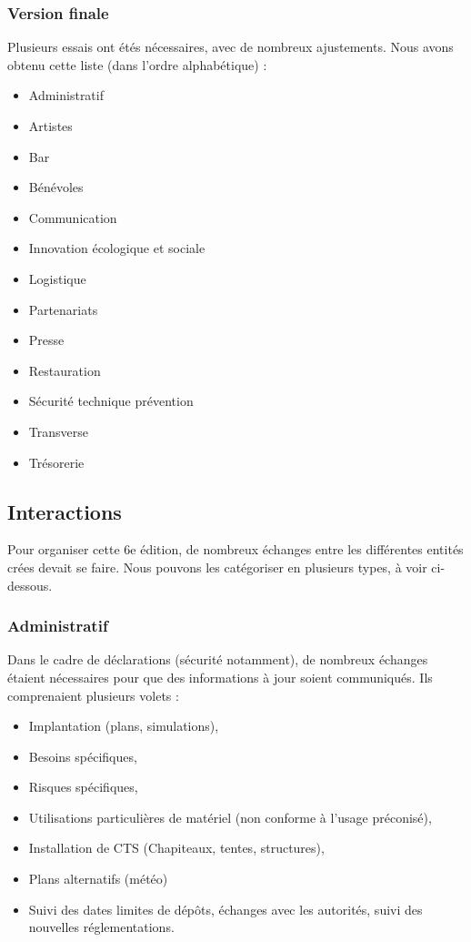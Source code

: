 \documentclass[12pt,a4paper,draft]{report}
\begin{document}
\subsubsection{Version finale}
Plusieurs essais ont étés nécessaires, avec de nombreux ajustements. Nous avons obtenu cette liste (dans l'ordre alphabétique) : 
\begin{itemize}
\item Administratif
\item Artistes
\item Bar
\item Bénévoles
\item Communication
\item Innovation écologique et sociale
\item Logistique
\item Partenariats
\item Presse
\item Restauration
\item Sécurité technique prévention
\item Transverse
\item Trésorerie
\end{itemize}

\subsection{Interactions}
Pour organiser cette 6e édition, de nombreux échanges entre les différentes entités crées devait se faire. Nous pouvons les catégoriser en plusieurs types, à voir ci-dessous.

\subsubsection{Administratif}
Dans le cadre de déclarations (sécurité notamment), de nombreux échanges étaient nécessaires pour que des informations à jour soient communiqués. Ils comprenaient plusieurs volets :
\begin{itemize}
\item Implantation (plans, simulations),
\item Besoins spécifiques,
\item Risques spécifiques,
\item Utilisations particulières de matériel (non conforme à l'usage préconisé),
\item Installation de CTS (Chapiteaux, tentes, structures),
\item Plans alternatifs (météo)
\item Suivi des dates limites de dépôts, échanges avec les autorités, suivi des nouvelles réglementations.
\end{itemize}
\end{document}
